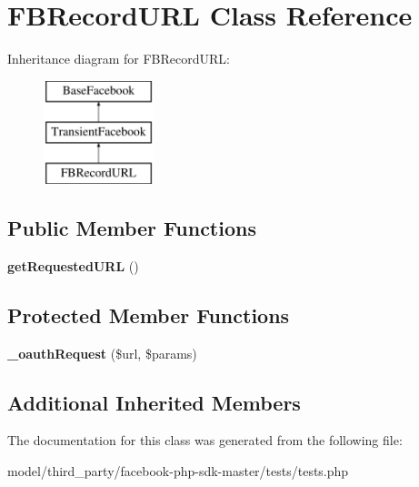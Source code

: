 \hypertarget{classFBRecordURL}{\section{F\-B\-Record\-U\-R\-L Class Reference}
\label{classFBRecordURL}
}
Inheritance diagram for F\-B\-Record\-U\-R\-L\-:\begin{figure}[H]
\begin{center}
\leavevmode
\includegraphics[height=3.000000cm]{classFBRecordURL}
\end{center}
\end{figure}
\subsection*{Public Member Functions}
\begin{DoxyCompactItemize}
\item 
\hypertarget{classFBRecordURL_a4565c384b9966b4a12f753e6d8648699}{{\bfseries get\-Requested\-U\-R\-L} ()}\label{classFBRecordURL_a4565c384b9966b4a12f753e6d8648699}

\end{DoxyCompactItemize}
\subsection*{Protected Member Functions}
\begin{DoxyCompactItemize}
\item 
\hypertarget{classFBRecordURL_ae81e680a268b7fcb0692ae9b370c2ab4}{{\bfseries \-\_\-oauth\-Request} (\$url, \$params)}\label{classFBRecordURL_ae81e680a268b7fcb0692ae9b370c2ab4}

\end{DoxyCompactItemize}
\subsection*{Additional Inherited Members}


The documentation for this class was generated from the following file\-:\begin{DoxyCompactItemize}
\item 
model/third\-\_\-party/facebook-\/php-\/sdk-\/master/tests/tests.\-php\end{DoxyCompactItemize}
